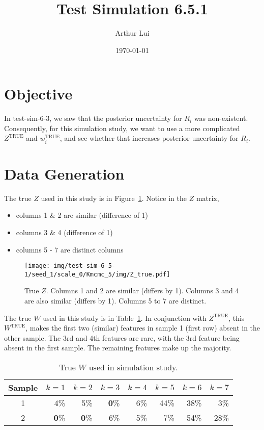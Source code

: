 \documentclass[12pt]{article} %
\title{Test Simulation 6.5.1}
\author{Arthur Lui}
\date{\today} %
\def\true{\text{TRUE}}
\newcommand{\bbh}{\color{blue}\textbf}  %
\begin{document}
\maketitle

\tableofcontents \newpage %

\section{Objective}\label{sec:objective}
In test-sim-6-3, we saw that the posterior uncertainty for $R_i$ was non-existent. 
Consequently, for this simulation study, we want to use a more complicated
$Z^\true$ and $w^\true_i$, and see whether that increases posterior uncertainty
for $R_i$.

\section{Data Generation}\label{sec:data-generation}
The true $Z$ used in this study is in Figure~\ref{fig:Z-true}.
Notice in the $Z$ matrix, 
\begin{itemize}
  \item columns 1 \& 2 are similar (difference of 1)
  \item columns 3 \& 4 (difference of 1)
  \item columns 5 - 7 are distinct columns
\end{itemize}

\begin{figure}[h]
  \begin{center}
    \texttt{[image: img/test-sim-6-5-1/seed\_1/scale\_0/Kmcmc\_5/img/Z\_true.pdf]}
  \end{center}
  \label{fig:Z-true}
  \caption{True $Z$. Columns 1 and 2 are similar (differs by 1). Columns 3 and
  4 are also similar (differs by 1). Columns 5 to 7 are distinct.}
\end{figure}

The true $W$ used in this study is in Table~\ref{tab:W-true}.  In conjunction
with $Z^\true$, this $W^\true$, makes the first two (similar) features in sample 1
(first row) absent in the other sample. The 3rd and 4th features are rare, with
the 3rd feature being absent in the first sample. The remaining features make
up the majority.

\begin{table}[H]
  \centering
  \begin{tabular}{|c|rrrrrrr|}
    \hline
    Sample & $k=1$ & $k=2$ & $k=3$ & $k=4$ & $k=5$ & $k=6$ & $k=7$ \\
    \hline
    1 & 4\% & 5\% & {\bbh 0\%} & 6\% & 44\% & 38\% & 3\% \\
    2 & {\bbh 0\%} & {\bbh 0\%} & 6\% & 5\% & 7\% & 54\% & 28\% \\
    \hline
  \end{tabular}
  \caption{True $W$ used in simulation study.}
  \label{tab:W-true}
\end{table}
\end{document}
